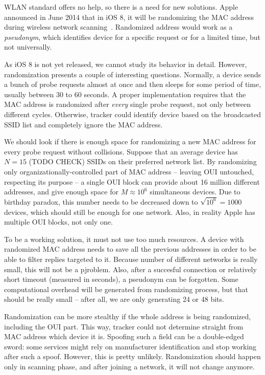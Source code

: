 \documentclass[12pt,a4paper,oneside,pdftex]{report}
\begin{document}
WLAN standard offers no help, so there is a need for new solutions. Apple announced in June 2014 that in iOS 8, it will be randomizing the MAC address during wireless network scanning~\cite{FredericJacobs2014,apple_wwdc_privacy}. Randomized address would work as a \emph{pseudonym}, which identifies device for a specific request or for a limited time, but not universally.

As iOS 8 is not yet released, we cannot study its behavior in detail. However, randomization presents a couple of interesting questions. Normally, a device sends a bunch of probe requests almost at once and then sleeps for some period of time, usually between 30 to 60 seconds. A proper implementation requires that the MAC address is randomized after \emph{every} single probe request, not only between different cycles. Otherwise, tracker could identify device based on the broadcasted SSID list and completely ignore the MAC address.

We should look if there is enough space for randomizing a new MAC address for every probe request without collisions. Suppose that an average device has $N = 15$ (TODO CHECK) SSIDs on their preferred network list. By randomizing only organizationally-controlled part of MAC address -- leaving OUI untouched, respecting its purpose -- a single OUI block can provide about 16 million different addresses, and give enough space for $M \approx 10^6$ simultaneous devices. Due to birthday paradox, this number needs to be decreased down to $\sqrt{10^6} = 1000$ devices, which should still be enough for one network. Also, in reality Apple has multiple OUI blocks, not only one.

To be a working solution, it must not use too much resources. A device with randomized MAC address needs to save all the previous addresses in order to be able to filter replies targeted to it. Because number of different networks is really small, this will not be a pjroblem. Also, after a succesful connection or relatively short timeout (measured in seconds), a pseudonym can be forgotten. Some computational overhead will be generated from randomizing process, but that should be really small -- after all, we are only generating 24 or 48 bits.

Randomization can be more stealthy if the whole address is being randomized, including the OUI part. This way, tracker could not determine straight from MAC address which device it is. Spoofing such a field can be a double-edged sword: some services might rely on manufacturer identification and stop working after such a spoof. However, this is pretty unlikely. Randomization should happen only in scanning phase, and after joining a network, it will not change anymore.
\end{document}
